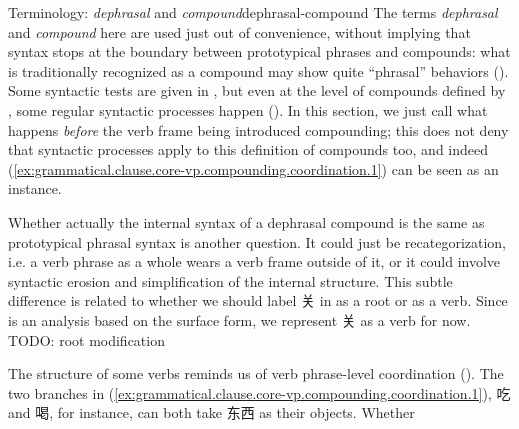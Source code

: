 \documentclass[UTF8, a4paper, oneside, scheme=plain, 12pt]{ctexrep}
\newcommand*{\citepages}[1]{pp.~{#1}}
\newcommand*{\term}[1]{\emph{#1}}
\newcommand{\form}[1]{\emph{#1}}
\newcommand{\translate}[1]{`#1'}
\begin{document}
\begin{theorybox}{Terminology: \term{dephrasal} and \term{compound}}{dephrasal-compound}
    The terms \term{dephrasal} and \term{compound} here are used just out of convenience,
    without implying that syntax stops at the boundary between prototypical phrases and compounds:
    what is traditionally recognized as a compound may show quite ``phrasal'' behaviors 
    ().
    Some syntactic tests are given in \citet[\citepages{448-451}]{cgel},
    but even at the level of compounds defined by \citeauthor{cgel},
    some regular syntactic processes happen ().
    In this section, we just call what happens \emph{before} the verb frame being introduced compounding;
    this does not deny that syntactic processes apply to this definition of compounds too,
    and indeed (\ref{ex:grammatical.clause.core-vp.compounding.coordination.1})
    can be seen as an instance.

    Whether actually the internal syntax of a dephrasal compound is the same as prototypical phrasal syntax is another question.
    It could just be recategorization, i.e. a verb phrase as a whole wears a verb frame outside of it,
    or it could involve syntactic erosion and simplification of the internal structure.
    This subtle difference is related to whether we should label 关 in  as a root or as a verb.
    Since  is an analysis based on the surface form,
    we represent 关 as a verb for now.%
    TODO: root modification
\end{theorybox}

The structure of some verbs reminds us of verb phrase-level coordination ().
The two branches in (\ref{ex:grammatical.clause.core-vp.compounding.coordination.1}), 吃 and 喝,
for instance, can both take 东西 as their objects.
Whether 
\end{document}
